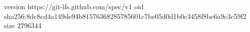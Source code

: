 version https://git-lfs.github.com/spec/v1
oid sha256:8dc8cd4a149de94b81576368285785601c7be05d0d1b0c3458f8be6a9c3c59f2
size 2796344
